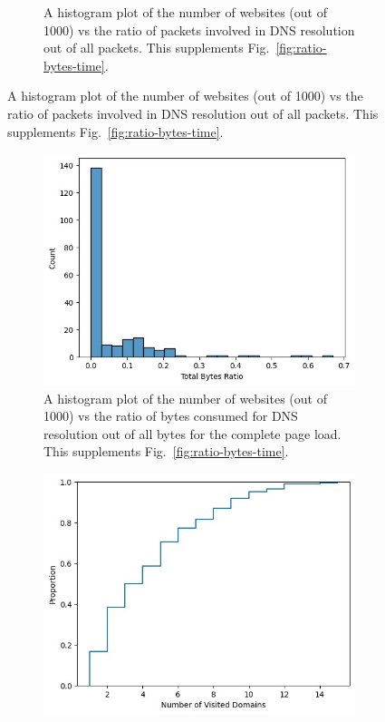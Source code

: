 \documentclass{article}
\begin{document}
\begin{figure}[htpb]
\begin{subfigure}[b]{0.48\linewidth}
        \vspace{-7mm}
        \caption{A histogram plot of the number of websites (out of 1000) vs the ratio of packets involved in DNS resolution out of all packets. This supplements Fig.~\ref{fig:ratio-bytes-time}.}
        \vspace{-3mm}
        \label{fig:packet-ratio}
    \end{subfigure}
\end{figure}

\begin{figure}[htpb]
    \centering
    \begin{subfigure}[b]{0.48\linewidth}
        \includegraphics[width=\linewidth]{plots/bytes-ratio.jpeg}
        \vspace{-7mm}
        \caption{A histogram plot of the number of websites (out of 1000) vs the ratio of bytes consumed for DNS resolution out of all bytes for the complete page load. This supplements Fig.~\ref{fig:ratio-bytes-time}.}
        \vspace{-3mm}
        \label{fig:bytes-ratio}
    \end{subfigure}
    \hfill
    \begin{subfigure}[b]{0.48\linewidth}
        \includegraphics[width=\linewidth]{plots/visited-cdf.jpeg}

\end{subfigure}
\end{figure}
\end{document}

